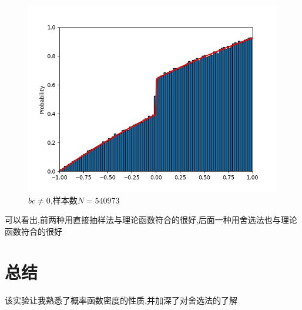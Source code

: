 \documentclass[UTF8]{ctexart}
\begin{document}
\begin{figure}[H]
    \centering
    \includegraphics[scale=0.5]{3.png}
    \caption{$bc\neq 0$,样本数$N=540973$}
\end{figure}

可以看出,前两种用直接抽样法与理论函数符合的很好,后面一种用舍选法也与理论函数符合的很好
\section{总结}
该实验让我熟悉了概率函数密度的性质,并加深了对舍选法的了解
\end{document}
